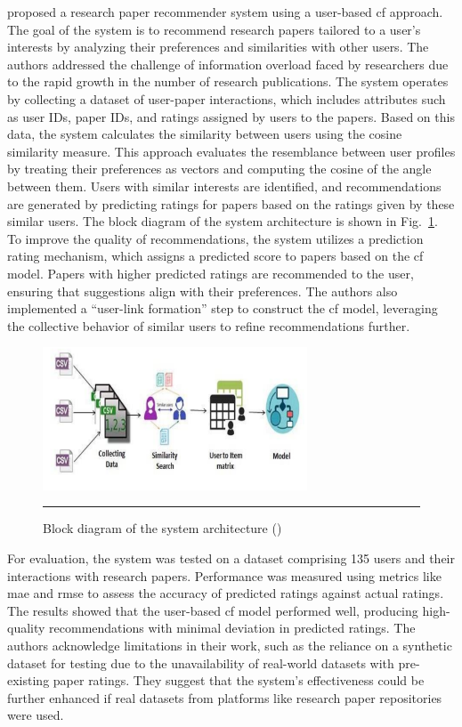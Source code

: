 \textcite{Murali2019} proposed a research paper recommender system using a user-based \gls{cf} approach.
The goal of the system is to recommend research papers tailored to a user's interests by analyzing their preferences and similarities with other users.
The authors addressed the challenge of information overload faced by researchers due to the rapid growth in the number of research publications.
The system operates by collecting a dataset of user-paper interactions, which includes attributes such as user IDs, paper IDs, and ratings assigned by users to the papers. Based on this data, the system calculates the similarity between users using the cosine similarity measure. This approach evaluates the resemblance between user profiles by treating their preferences as vectors and computing the cosine of the angle between them.
Users with similar interests are identified, and recommendations are generated by predicting ratings for papers based on the ratings given by these similar users.
The block diagram of the system architecture is shown in Fig.~\ref{fig:murali}.
To improve the quality of recommendations, the system utilizes a prediction rating mechanism, which assigns a predicted score to papers based on the \gls{cf} model.
Papers with higher predicted ratings are recommended to the user, ensuring that suggestions align with their preferences.
The authors also implemented a ``user-link formation'' step to construct the \gls{cf} model, leveraging the collective behavior of similar users to refine recommendations further.

\begin{figure}[htbp]
    \centering
 \includegraphics[width=0.7\textwidth]{figures/literature-review/murali.png}
     \rule{35em}{0.5pt}
    \caption{Block diagram of the system architecture (\textcite{Murali2019})}
 \label{fig:murali}
\end{figure}

For evaluation, the system was tested on a dataset comprising 135 users and their interactions with research papers.
Performance was measured using metrics like \gls{mae} and \gls{rmse} to assess the accuracy of predicted ratings against actual ratings.
The results showed that the user-based \gls{cf} model performed well, producing high-quality recommendations with minimal deviation in predicted ratings.
The authors acknowledge limitations in their work, such as the reliance on a synthetic dataset for testing due to the unavailability of real-world datasets with pre-existing paper ratings.
They suggest that the system's effectiveness could be further enhanced if real datasets from platforms like research paper repositories were used.

